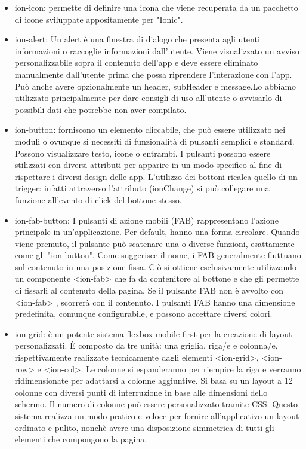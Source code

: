 \begin{itemize}
\item ion-icon: permette di definire una icona che viene recuperata da un pacchetto di icone sviluppate appositamente per "Ionic".
\item ion-alert: Un alert è una finestra di dialogo che presenta agli utenti informazioni o raccoglie informazioni dall'utente. Viene visualizzato un avviso personalizzabile sopra il contenuto dell'app e deve essere eliminato manualmente dall'utente prima che possa riprendere l'interazione con l'app. Può anche avere opzionalmente un header, subHeader e message.Lo abbiamo utilizzato principalmente per dare consigli di uso all'utente o avvisarlo di possibili dati che potrebbe non aver compilato.
\item ion-button:  forniscono un elemento cliccabile, che può essere utilizzato nei moduli o ovunque si necessiti di funzionalità di pulsanti semplici e standard. Possono visualizzare testo, icone o entrambi. I pulsanti possono essere stilizzati con diversi attributi per apparire in un modo specifico al fine di rispettare i diversi design delle app. L'utilizzo dei bottoni ricalca quello di un trigger: infatti attraverso l'attributo (ionChange) si può collegare una funzione all'evento di click del bottone stesso.
\item ion-fab-button: I pulsanti di azione mobili (FAB) rappresentano l'azione principale in un'applicazione. Per default, hanno una forma circolare. Quando viene premuto, il pulsante può scatenare una o diverse funzioni, esattamente come gli "ion-button". Come suggerisce il nome, i FAB generalmente fluttuano sul contenuto in una posizione fissa. Ciò si ottiene esclusivamente utilizzando un componente <ion-fab> che fa da contenitore al bottone e che gli permette di fissarli al contenuto della pagina. Se il pulsante FAB non è avvolto con  <ion-fab> , scorrerà con il contenuto. I pulsanti FAB hanno una dimensione predefinita, comunque configurabile, e possono accettare diversi colori.
\item ion-grid: è un potente sistema flexbox mobile-first per la creazione di layout personalizzati. È composto da tre unità: una griglia, riga/e e colonna/e, rispettivamente realizzate tecnicamente dagli elementi <ion-grid>, <ion-row> e <ion-col>. Le colonne si espanderanno per riempire la riga e verranno ridimensionate per adattarsi a colonne aggiuntive. Si basa su un layout a 12 colonne con diversi punti di interruzione in base alle dimensioni dello schermo. Il numero di colonne può essere personalizzato tramite CSS.
Questo sistema realizza un modo pratico e veloce per fornire all'applicativo un layout ordinato e pulito, nonchè avere una disposizione simmetrica di tutti gli elementi che compongono la pagina.

\end{itemize}
